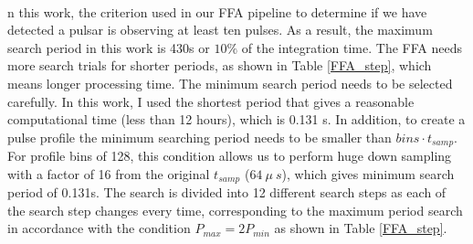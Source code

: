 \documentclass[thesis_msc.tex]{subfiles}
\begin{document}
\paragraph{} n this work, the criterion used in our FFA pipeline to determine if we have detected a pulsar is observing at least ten pulses. As a result, the maximum search period in this work is 430s or $10\%$ of the integration time. The FFA needs more search trials for shorter periods, as shown in Table \ref{FFA_step}, which means longer processing time. The minimum search period needs to be selected carefully. In this work, I used the shortest period that gives a reasonable computational time (less than 12 hours), which is 0.131 s. In addition,  to create a pulse profile the  minimum searching period needs to be smaller than $bins \cdot t_{samp}$. For profile bins of 128, this condition allows us to perform huge down sampling with a factor of 16 from the original $t_{samp}$ ($64~\mu~s$), which gives minimum search period of 0.131s. The search is divided into 12 different search steps as each of the search step changes every time, corresponding to the maximum period search in accordance with the condition $P_{max}=2 P_{min}$ as shown in Table \ref{FFA_step}.       

\end{document}

